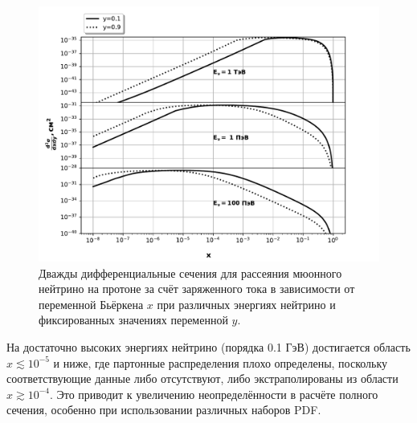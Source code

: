 \begin{figure}[!h]
\centering
\includegraphics[width=\linewidth]{images/NuProp/xs_vs_xCT18ZNNLO_cc_12_proton.pdf}
\caption{Дважды дифференциальные сечения для рассеяния мюонного нейтрино на протоне за счёт заряженного тока в зависимости от переменной Бьёркена $x$ при различных энергиях нейтрино и фиксированных значениях переменной $y$.}
\label{fig:xsec_2d}
\end{figure}

На достаточно высоких энергиях нейтрино (порядка 0.1 ГэВ) достигается область $x \lesssim 10^{-5}$ и ниже, где партонные распределения плохо определены, поскольку соответствующие данные либо отсутствуют, либо экстраполированы из области $x \gtrsim 10^{-4}$. Это приводит к увеличению неопределённости в расчёте полного сечения, особенно при использовании различных наборов PDF.

